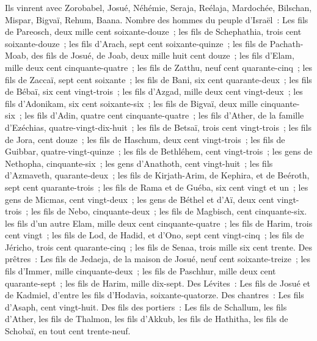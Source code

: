 \begin{multicols}{2}
Ils vinrent avec Zorobabel, Josué, Néhémie, Seraja, Reélaja, Mardochée, Bilschan, Mispar, Bigvaï, Rehum, Baana. Nombre des hommes du peuple d'Israël~:
Les fils de Pareosch, deux mille cent soixante-douze~;
les fils de Schephathia, trois cent soixante-douze~;
les fils d'Arach, sept cent soixante-quinze~;
les fils de Pachath-Moab, des fils de Josué, de Joab, deux mille huit cent douze~;
les fils d'Elam, mille deux cent cinquante-quatre~;
les fils de Zatthu, neuf cent quarante-cinq~;
les fils de Zaccaï, sept cent soixante~;
les fils de Bani, six cent quarante-deux~;
les fils de Bébaï, six cent vingt-trois~;
les fils d'Azgad, mille deux cent vingt-deux~;
les fils d'Adonikam, six cent soixante-six~;
les fils de Bigvaï, deux mille cinquante-six~;
les fils d'Adin, quatre cent cinquante-quatre~;
les fils d'Ather, de la famille d'Ezéchias, quatre-vingt-dix-huit~;
les fils de Betsaï, trois cent vingt-trois~;
les fils de Jora, cent douze~;
les fils de Haschum, deux cent vingt-trois~;
les fils de Guibbar, quatre-vingt-quinze~;
les fils de Bethléhem, cent vingt-trois~;
les gens de Nethopha, cinquante-six~;
les gens d'Anathoth, cent vingt-huit~;
les fils d'Azmaveth, quarante-deux~;
les fils de Kirjath-Arim, de Kephira, et de Beéroth, sept cent quarante-trois~;
les fils de Rama et de Guéba, six cent vingt et un~;
les gens de Micmas, cent vingt-deux~;
les gens de Béthel et d'Aï, deux cent vingt-trois~;
les fils de Nebo, cinquante-deux~;
les fils de Magbisch, cent cinquante-six.
les fils d'un autre Elam, mille deux cent cinquante-quatre~;
les fils de Harim, trois cent vingt~;
les fils de Lod, de Hadid, et d'Ono, sept cent vingt-cinq~;
les fils de Jéricho, trois cent quarante-cinq~;
les fils de Senaa, trois mille six cent trente.
Des prêtres~: Les fils de Jedaeja, de la maison de Josué, neuf cent soixante-treize~;
les fils d'Immer, mille cinquante-deux~;
les fils de Paschhur, mille deux cent quarante-sept~;
les fils de Harim, mille dix-sept.
Des Lévites~: Les fils de Josué et de Kadmiel, d'entre les fils d'Hodavia, soixante-quatorze.
Des chantres~: Les fils d'Asaph, cent vingt-huit.
Des fils des portiers~: Les fils de Schallum, les fils d'Ather, les fils de Thalmon, les fils d'Akkub, les fils de Hathitha, les fils de Schobaï, en tout cent trente-neuf.

\end{multicols}
